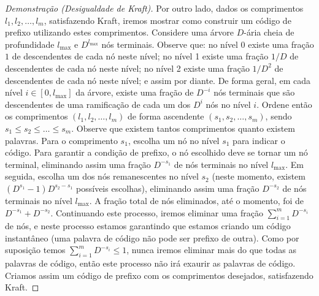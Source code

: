 \begin{proof}[Demonstração (Desigualdade de Kraft)]
Por outro lado, dados os comprimentos $l_1, l_2, \ldots, l_m$, satisfazendo Kraft, iremos mostrar como
construir um código de prefixo utilizando estes comprimentos.
Considere uma árvore $D$-ária cheia de profundidade $l_{\text{max}}$ e $D^{l_{\text{max}}}$ nós terminais.
Observe que: no nível 0 existe uma fração $1$ de descendentes de cada nó neste nível;
no nível 1 existe uma fração $1/D$ de descendentes de cada nó neste nível;
no nível 2 existe uma fração $1/D^2$ de descendentes de cada nó neste nível; e assim por diante.
De forma geral, em cada nível $i \in [0, l_{\text{max}}]$ da árvore, existe uma fração de $D^{-i}$
nós terminais que são descendentes de uma ramificação de cada um dos $D^i$ nós no nível $i$.
Ordene então os comprimentos $(l_1, l_2, \ldots, l_m)$ de forma ascendente $(s_1, s_2, \ldots, s_m)$,
sendo $s_1 \leq s_2 \leq \ldots \leq s_m$. Observe que existem tantos comprimentos quanto existem palavras.
Para o comprimento $s_1$, escolha um nó no nível $s_1$ para indicar o código.
Para garantir a condição de prefixo, o nó escolhido deve se tornar um nó terminal, eliminando assim uma
fração $D^{-s_1}$ de nós terminais no nível $l_{\text{max}}$.
Em seguida, escolha um dos nós remanescentes no nível $s_2$ (neste momento, existem $(D^{s_1}-1)D^{s_2-s_1}$
possíveis escolhas), eliminando assim uma fração $D^{-s_2}$ de nós terminais no nível $l_{\text{max}}$.
A fração total de nós eliminados, até o momento, foi de $D^{-s_1} + D^{-s_2}$.
Continuando este processo, iremos eliminar uma fração $\sum_{i=1}^{m} D^{-s_i}$ de nós, e neste processo
estamos garantindo que estamos criando um código instantâneo (uma palavra de código não pode ser prefixo de outra).
Como por suposição temos $\sum_{i=1}^{m} D^{-s_i} \leq 1$, nunca iremos eliminar mais do que todas as palavras
de código, então este processo não irá exaurir as palavras de código.
Criamos assim um código de prefixo com os comprimentos desejados, satisfazendo Kraft.
\end{proof}

